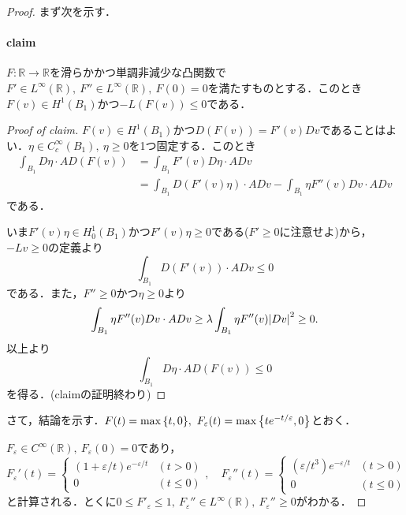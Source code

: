 \documentclass[a4paper]{ltjsarticle}
\newcommand{\Rset}{\mathbb{R}}
\newcommand{\1}{\mathbbm{1}}
\numberwithin{equation}{section}
\theoremstyle{definition}
\begin{document}
\begin{proof}
    まず次を示す．
    \paragraph*{claim}$F\colon \Rset\to\Rset$を滑らかかつ単調非減少な凸関数で$F'\in L^\infty(\Rset),\ F''\in L^{\infty}(\Rset),\ F(0)=0$を満たすものとする．このとき$F(v)\in H^1(B_1)$かつ$-L(F(v))\leq0$である．
    \begin{proof}[Proof of claim]
        $F(v)\in H^1(B_1)$かつ$D(F(v))=F'(v)Dv$であることはよい．$\eta\in C^{\infty}_c(B_1),\ \eta\geq0$を1つ固定する．このとき
        \begin{align}
            \int_{B_1}D\eta\cdot AD(F(v))&=\int_{B_1}F'(v)D\eta\cdot ADv\\
            &=\int_{B_1}D(F'(v)\eta)\cdot ADv-\int_{B_1}\eta F''(v)Dv\cdot ADv
        \end{align}
        である．
        
        いま$F'(v)\eta\in H^1_0(B_1)$かつ$F'(v)\eta\geq0$である($F'\geq0$に注意せよ)から，$-Lv\geq0$の定義より
        \begin{equation}
            \int_{B_1}D(F'(v))\cdot ADv\leq0 
        \end{equation}
        である．また，$F''\geq0$かつ$\eta\geq0$より
        \begin{equation}
            \int_{B_1}\eta F''(v) Dv\cdot ADv\geq \lambda\int_{B_1}\eta F''(v) \abs{Dv}^2\geq0 .
        \end{equation}
        以上より
        \begin{equation}
            \int_{B_1}D\eta\cdot AD(F(v))\leq0 
        \end{equation}
        を得る．(claimの証明終わり)
    \end{proof}
    さて，結論を示す．$F(t)=\max\qty{t,0},\ F_{\varepsilon}(t)=\max\qty{te^{-t/\varepsilon},0}$とおく．

    $F_\varepsilon\in C^{\infty}(\Rset),\ F_{\varepsilon}(0)=0$であり，
    \begin{equation}
        F_\varepsilon'(t)=\begin{cases}
            (1+\varepsilon/t)e^{-\varepsilon/t} & (t>0)\\
            0 & (t\leq0)
        \end{cases},\quad F_{\varepsilon}''(t)=\begin{cases}
            (\varepsilon/t^3)e^{-\varepsilon/t} & (t>0)\\
             0 & (t\leq0)
        \end{cases}
    \end{equation}
    と計算される．とくに$0\leq F'_{\varepsilon}\leq1,\ F_{\varepsilon}''\in L^\infty(\Rset),\ F_{\varepsilon}''\geq0$がわかる．


\end{proof}
\end{document}
